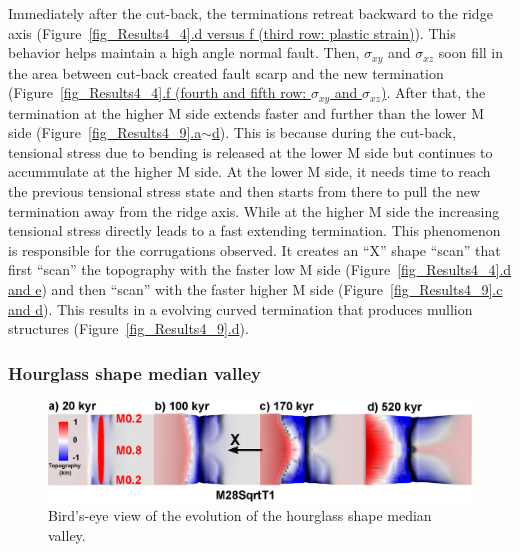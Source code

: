 Immediately after the cut-back, the terminations retreat backward to the ridge axis (Figure~\hyperref[fig_Results4_4]{\ref{fig_Results4_4}.d versus f (third row: plastic strain)}). This behavior helps maintain a high angle normal fault. Then, $\sigma_{xy}$ and $\sigma_{xz}$ soon fill in the area between cut-back created fault scarp and the new termination (Figure~\hyperref[fig_Results4_4]{\ref{fig_Results4_4}.f (fourth and fifth row: $\sigma_{xy}$ and $\sigma_{xz}$)}. After that, the termination at the higher M side extends faster and further than the lower M side (Figure~\hyperref[fig_Results4_9]{\ref{fig_Results4_9}.a$\sim$d}). This is because during the cut-back, tensional stress due to bending is released at the lower M side but continues to accummulate at the higher M side. At the lower M side, it needs time to reach the previous tensional stress state and then starts from there to pull the new termination away from the ridge axis. While at the higher M side the increasing tensional stress directly leads to a fast extending termination.
This phenomenon is responsible for the corrugations observed. It creates an ``X'' shape ``scan'' that first ``scan'' the topography with the faster low M side (Figure~\hyperref[fig_Results4_4]{\ref{fig_Results4_4}.d and e}) and then ``scan'' with the faster higher M side (Figure~\hyperref[fig_Results4_9]{\ref{fig_Results4_9}.c and d}). This results in a evolving curved termination that produces mullion structures (Figure~\hyperref[fig_Results4_9]{\ref{fig_Results4_9}.d}).    

\subsubsection{Hourglass shape median valley}

\begin{figure}[h]
  \centering
    \includegraphics[width=1.0\textwidth]{./Figures/fig_Results_3_2_hourglass_evolution.eps}
  \caption{Bird's-eye view of the evolution of the hourglass shape median valley.}
 \label{fig_Results_3_2_hourglass_evolution}
\end{figure}


